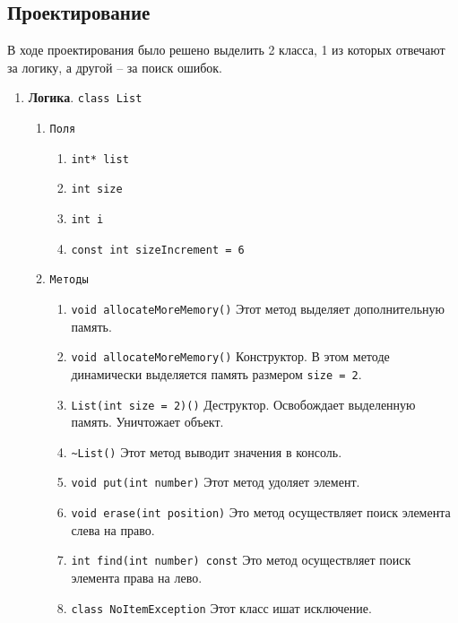 \documentclass[12pt,a4paper]{report}
\begin{document}
\subsection{Проектирование}
\hspace{\parindent}
В ходе проектирования было решено выделить 2 класса, 1 из которых отвечают за логику, а другой -- за поиск ошибок.
\begin{enumerate}
\item \textbf{Логика}. \verb+class List+
\hspace{\parindent}
\begin{enumerate}

\item \verb+Поля+
\begin{enumerate}
\item \verb-int* list-
\item \verb-int size-
\item \verb-int i-
\item \verb-const int sizeIncrement = 6-
\end{enumerate}

\item \verb+Методы+
\begin{enumerate}
\item \verb-void allocateMoreMemory()- Этот метод выделяет дополнительную память.
\item \verb-void allocateMoreMemory()- Конструктор. В этом методе динамически выделяется память размером \verb+size = 2+.
\item \verb-List(int size = 2)()- Деструктор. Освобождает выделенную память. Уничтожает объект.
\item \verb-~List()- Этот метод выводит значения в консоль.
\item \verb-void put(int number)- Этот метод удоляет элемент.
\item \verb-void erase(int position)- Это метод осуществляет поиск элемента слева на право.
\item \verb-int find(int number) const- Это метод осуществляет поиск элемента права на лево.
\item \verb-class NoItemException- Этот класс ишат исключение.

\end{enumerate}
\end{enumerate}
\end{enumerate}
\end{document}
